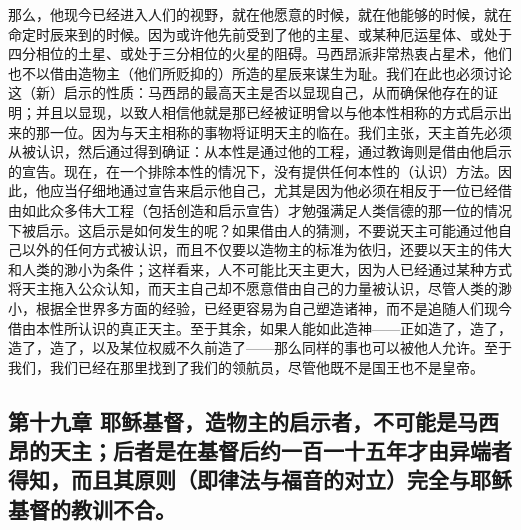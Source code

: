 那么，他现今已经进入人们的视野，就在他愿意的时候，就在他能够的时候，就在命定时辰来到的时候。因为或许他先前受到了他的主星、或某种厄运星体、或处于四分相位的土星、或处于三分相位的火星的阻碍。马西昂派非常热衷占星术，他们也不以借由造物主（他们所贬抑的）所造的星辰来谋生为耻。我们在此也必须讨论这（新）启示的性质：马西昂的最高天主是否以显现自己，从而确保他存在的证明；并且以显现，以致人相信他就是那已经被证明曾以与他本性相称的方式启示出来的那一位。因为与天主相称的事物将证明天主的临在。我们主张，天主首先必须从被认识，然后通过得到确证：从本性是通过他的工程，通过教诲则是借由他启示的宣告。现在，在一个排除本性的情况下，没有提供任何本性的（认识）方法。因此，他应当仔细地通过宣告来启示他自己，尤其是因为他必须在相反于一位已经借由如此众多伟大工程（包括创造和启示宣告）才勉强满足人类信德的那一位的情况下被启示。这启示是如何发生的呢？如果借由人的猜测，不要说天主可能通过他自己以外的任何方式被认识，而且不仅要以造物主的标准为依归，还要以天主的伟大和人类的渺小为条件；这样看来，人不可能比天主更大，因为人已经通过某种方式将天主拖入公众认知，而天主自己却不愿意借由自己的力量被认识，尽管人类的渺小，根据全世界多方面的经验，已经更容易为自己塑造诸神，而不是追随人们现今借由本性所认识的真正天主。至于其余，如果人能如此造神——正如造了，造了，造了，造了，以及某位权威不久前造了——那么同样的事也可以被他人允许。至于我们，我们已经在那里找到了我们的领航员，尽管他既不是国王也不是皇帝。\par


\subsection{第十九章 耶稣基督，造物主的启示者，不可能是马西昂的天主；后者是在基督后约一百一十五年才由异端者得知，而且其原则（即律法与福音的对立）完全与耶稣基督的教训不合。}


